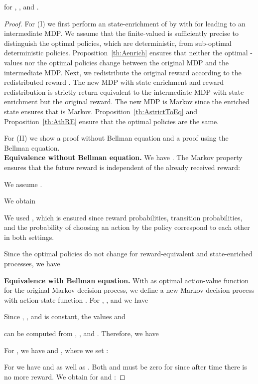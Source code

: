 \documentclass{article}
\begin{document}
\begin{appendices}
\begin{propositionA}
for , , and .
\end{propositionA}


\begin{proof}
For (I) we first perform an state-enrichment of  by
 with  for  leading to an intermediate MDP.
We assume that the finite-valued  is 
sufficiently precise to distinguish the 
optimal policies, which are deterministic, 
from sub-optimal deterministic policies. 
Proposition~\ref{th:Aenrich} ensures that 
neither the optimal -values 
nor the optimal policies change between the original MDP 
and the intermediate MDP.
Next, we redistribute the original reward  
according to the redistributed reward . 
The new MDP  with state enrichment and reward redistribution
is strictly return-equivalent to 
the intermediate MDP with state enrichment but the original reward.
The new MDP  is Markov since the enriched state ensures that
 is Markov.
Proposition~\ref{th:AstrictToEq} and Proposition~\ref{th:AthRE} ensure that
the optimal policies are the same.

For (II) we show a proof without Bellman equation and a proof using
the Bellman equation.\\
{\bf Equivalence without Bellman equation.}
We have .
The Markov property ensures that the future reward is independent of
the already received reward:

We assume .

We obtain
 
We used , which is ensured
since reward probabilities, transition probabilities, and
the probability of choosing an action by the policy correspond to each
other in both settings.  


Since the optimal policies do not change for
reward-equivalent and state-enriched processes,
we have
 



{\bf Equivalence with Bellman equation.}
With  as optimal action-value function for the
original Markov decision process, we define a new Markov
decision process with action-state function .
For , , and  we have
 

Since , , and  is
constant, the values  and

can be computed from
, , and . Therefore, we have 
 


For , we have  and , where we set
:
 

For  we have  and
 as well as .
Both  and  must be zero for  since after time 
there is no more reward.
We obtain for  and :
 



\end{proof}
\end{appendices}
\end{document}
